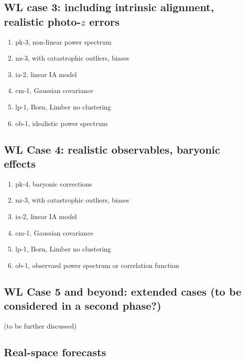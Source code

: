 \subsection*{WL case 3: including intrinsic alignment, realistic photo-$z$ errors}

\begin{enumerate}
\setlength{\itemsep}{0pt}\setlength{\parskip}{0pt}
\item pk-3, non-linear power spectrum
\item nz-3, with catastrophic outliers, biases
\item ia-2, linear IA model
\item cm-1, Gaussian covariance
\item lp-1, Born, Limber no clustering
\item ob-1, idealistic power spectrum
\end{enumerate}

\subsection*{WL Case 4: realistic observables, baryonic effects}

\begin{enumerate}
\setlength{\itemsep}{0pt}\setlength{\parskip}{0pt}
\item pk-4, baryonic corrections
\item nz-3, with catastrophic outliers, biases
\item ia-2, linear IA model
\item cm-1, Gaussian covariance
\item lp-1, Born, Limber no clustering
\item ob-1, observaed power spectrum or correlation function
\end{enumerate}


\subsection*{WL Case 5 and beyond:  extended cases (to be considered in a second phase?) }  

(to be further discussed)


\subsection{Real-space forecasts}

